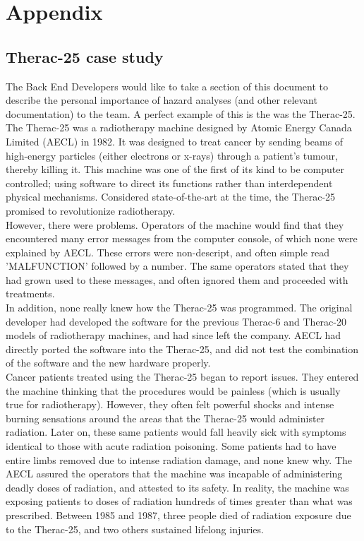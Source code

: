 \documentclass{article}
\begin{document}
\section*{Appendix}
\subsection*{Therac-25 case study}
The Back End Developers would like to take a section of this document to describe the personal importance of hazard analyses (and other relevant documentation) to the team. A perfect example of this is the was the Therac-25.\\

The Therac-25 was a radiotherapy machine designed by Atomic Energy Canada Limited (AECL) in 1982. It was designed to treat cancer by sending beams of high-energy particles (either electrons or x-rays) through a patient's tumour, thereby killing it. This machine was one of the first of its kind to be computer controlled; using software to direct its functions rather than interdependent physical mechanisms. \cite{leveson-1999} Considered state-of-the-art at the time, the Therac-25 promised to revolutionize radiotherapy.\\

However, there were problems. Operators of the machine would find that they encountered many error messages from the computer console, of which none were explained by AECL. These errors were non-descript, and often simple read 'MALFUNCTION' followed by a number. The same operators stated that they had grown used to these messages, and often ignored them and proceeded with treatments.\\

In addition, none really knew how the Therac-25 was programmed. The original developer had developed the software for the previous Therac-6 and Therac-20 models of radiotherapy machines, and had since left the company. AECL had directly ported the software into the Therac-25, and did not test the combination of the software and the new hardware properly.\\

Cancer patients treated using the Therac-25 began to report issues. They entered the machine thinking that the procedures would be painless (which is usually true for radiotherapy). However, they often felt powerful shocks and intense burning sensations around the areas that the Therac-25 would administer radiation. Later on, these same patients would fall heavily sick with symptoms identical to those with acute radiation poisoning. Some patients had to have entire limbs removed due to intense radiation damage, and none knew why. The AECL assured the operators that the machine was incapable of administering deadly doses of radiation, and attested to its safety.\cite{leveson-turner-1993} In reality, the machine was exposing patients to doses of radiation hundreds of times greater than what was prescribed.\cite{baase-henry-2019} Between 1985 and 1987, three people died of radiation exposure due to the Therac-25, and two others sustained lifelong injuries.\\
\end{document}
